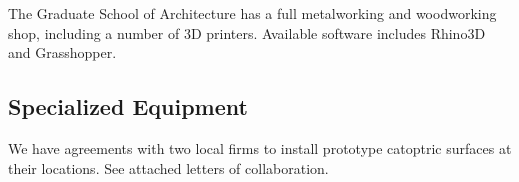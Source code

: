 \documentclass[11pt]{article}
\begin{document}
\vspace{0.1in}
\noindent
The Graduate School of Architecture has a full metalworking and woodworking
shop, including a number of 3D printers.  Available software
includes Rhino3D and Grasshopper.

\subsection*{Specialized Equipment}

We have agreements with two local firms to install prototype catoptric
surfaces at their locations.  See attached letters of collaboration.
\end{document}
